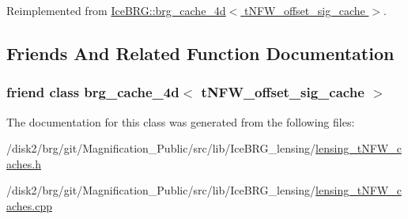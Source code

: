 Reimplemented from \hyperlink{classIceBRG_1_1brg__cache__4d_a422e37f487c9c39ce42d26e3b1866693}{Ice\-B\-R\-G\-::brg\-\_\-cache\-\_\-4d$<$ t\-N\-F\-W\-\_\-offset\-\_\-sig\-\_\-cache $>$}.



\subsection{Friends And Related Function Documentation}
\hypertarget{classIceBRG_1_1tNFW__offset__sig__cache_a2eb544ffcd492a0d9b3b8b21e832c03b}{
\subsubsection[{brg\-\_\-cache\-\_\-4d$<$ t\-N\-F\-W\-\_\-offset\-\_\-sig\-\_\-cache $>$}]{\setlength{\rightskip}{0pt plus 5cm}friend class {\bf brg\-\_\-cache\-\_\-4d}$<$ {\bf t\-N\-F\-W\-\_\-offset\-\_\-sig\-\_\-cache} $>$\hspace{0.3cm}{\ttfamily [friend]}}}\label{classIceBRG_1_1tNFW__offset__sig__cache_a2eb544ffcd492a0d9b3b8b21e832c03b}


The documentation for this class was generated from the following files\-:\begin{DoxyCompactItemize}
\item 
/disk2/brg/git/\-Magnification\-\_\-\-Public/src/lib/\-Ice\-B\-R\-G\-\_\-lensing/\hyperlink{lensing__tNFW__caches_8h}{lensing\-\_\-t\-N\-F\-W\-\_\-caches.\-h}\item 
/disk2/brg/git/\-Magnification\-\_\-\-Public/src/lib/\-Ice\-B\-R\-G\-\_\-lensing/\hyperlink{lensing__tNFW__caches_8cpp}{lensing\-\_\-t\-N\-F\-W\-\_\-caches.\-cpp}\end{DoxyCompactItemize}
